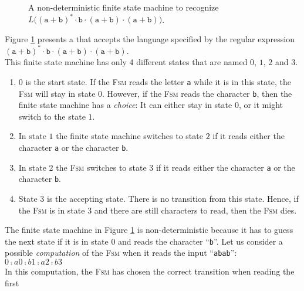\begin{figure}[!ht]
  \centering
   \caption{A non-deterministic finite state machine to recognize 
           $L\bigl((\texttt{a}+\texttt{b})^* \cdot \texttt{b} \cdot (\texttt{a}+\texttt{b}) \cdot (\texttt{a}+\texttt{b})\bigr)$.}
  \label{fig:abstarbabab-nd.dot}
\end{figure}
\noindent
Figure \ref{fig:abstarbabab-nd.dot} presents a  that accepts
the language specified by the regular expression
\\[0.2cm]
\hspace*{1.3cm}
$(\texttt{a}+\texttt{b})^* \cdot \texttt{b} \cdot (\texttt{a}+\texttt{b}) \cdot (\texttt{a}+\texttt{b})$.
\\[0.2cm]
This finite state machine has only 4 different states that are named $0$, $1$, $2$ and $3$.
\begin{enumerate}
\item $0$ is the start state.  If the \textsc{Fsm} reads the letter \texttt{a} while it is in this
      state, the \textsc{Fsm} will stay in state 0.  However, if the \textsc{Fsm} reads the
      character \texttt{b}, then the finite state machine has a \emph{choice}:  It can either stay in state
      $0$, or it might switch to the state $1$.
\item In state $1$ the finite state machine switches to state $2$ if it reads either the character
      \texttt{a} or the character \texttt{b}.
\item In state $2$ the \textsc{Fsm} switches to state $3$ if it reads either the character
      \texttt{a} or the character \texttt{b}.
\item State  $3$ is the accepting state.  There is no transition from this state.  Hence, if the
      \textsc{Fsm} is in state 3 and there are still characters to read, then the \textsc{Fsm} dies.
\end{enumerate}
The finite state machine in Figure \ref{fig:abstarbabab-nd.dot} is non-deterministic because it has
to guess the next state if it is in state 0 and reads the character ``\texttt{b}''.  Let us consider a possible
\emph{computation} of the \textsc{Fsm} when it reads the input ``\texttt{abab}'':
\\[0.2cm]
\hspace*{1.3cm}
$0 \comp{a} 0 \comp{b} 1 \comp{a} 2 \comp{b} 3$
\\[0.2cm]
In this computation, the \textsc{Fsm} has chosen the correct transition when reading the first
